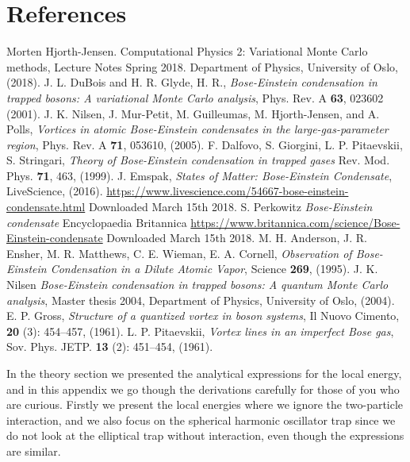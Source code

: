 \documentclass[norsk,a4paper,12pt]{article}
\begin{document}
\section{References}
\begingroup
\renewcommand{\section}[2]{}
\begin{thebibliography}{}
	Morten Hjorth-Jensen.
	Computational Physics 2: Variational Monte Carlo methods, Lecture Notes Spring 2018.
	Department of Physics, University of Oslo,
	(2018).
	J. L. DuBois and H. R. Glyde, H. R., \emph{Bose-Einstein condensation in trapped bosons: A variational Monte Carlo analysis}, Phys. Rev. A \textbf{63}, 023602 (2001).
	J. K. Nilsen,  J. Mur-Petit, M. Guilleumas, M. Hjorth-Jensen, and A. Polls, \emph{Vortices in atomic Bose-Einstein condensates in the large-gas-parameter region}, Phys. Rev. A \textbf{71}, 053610, (2005).
	F. Dalfovo, S. Giorgini, L. P. Pitaevskii, S. Stringari, \emph{Theory of Bose-Einstein condensation in trapped gases} Rev. Mod. Phys. \textbf{71}, 463, (1999).
	J. Emspak, \emph{States of Matter: Bose-Einstein Condensate}, LiveScience, (2016).
	\url{https://www.livescience.com/54667-bose-einstein-condensate.html}
	Downloaded March 15th 2018.
	S. Perkowitz \emph{Bose-Einstein condensate} Encyclopaedia Britannica 
	\url{https://www.britannica.com/science/Bose-Einstein-condensate}
	Downloaded March 15th 2018.
	    M. H. Anderson, J. R. Ensher, M. R. Matthews, C. E. Wieman, E. A. Cornell, \emph{Observation of Bose-Einstein Condensation in a Dilute Atomic Vapor}, Science \textbf{269}, (1995).
		J. K. Nilsen \emph{Bose-Einstein condensation in trapped bosons: A quantum Monte Carlo analysis}, Master thesis 2004, Department of Physics, University of Oslo, (2004). 
		E. P. Gross, \emph{Structure of a quantized vortex in boson systems}, Il Nuovo Cimento, \textbf{20} (3): 454–457, (1961).
		 L. P. Pitaevskii, \emph{Vortex lines in an imperfect Bose gas}, Sov. Phys. JETP. \textbf{13} (2): 451–454, (1961).

	
\end{thebibliography}
\endgroup

\newpage

\section*{Appendix A} \label{appendix_A}
In the theory section we presented the analytical expressions for the local energy, and in this appendix we go though the derivations carefully for those of you who are curious. Firstly we present the local energies where we ignore the two-particle interaction, and we also focus on the spherical harmonic oscillator trap since we do not look at the elliptical trap without interaction, even though the expressions are similar.
\end{document}
